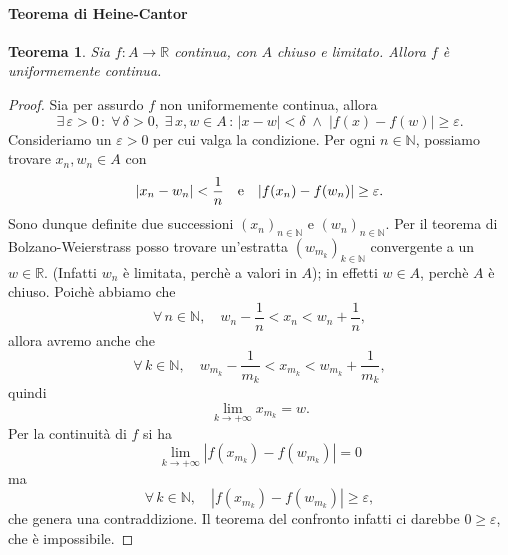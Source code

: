 \documentclass{article}
\theoremstyle{plain}
\newtheorem{thm}{Teorema}[section]
\theoremstyle{definition}
\theoremstyle{remark}
\begin{document}
\vspace{10pt}

\paragraph{Teorema di Heine-Cantor}
\begin{bxthm}
\begin{thm}
    Sia $f:A\to\mathbb{R}$ continua, con $A$ chiuso e limitato.
    Allora $f$ è uniformemente continua.
\end{thm}
\end{bxthm}
\begin{proof}
    Sia per assurdo $f$ non uniformemente continua, allora
    \[\exists\,\varepsilon>0\,:\;\forall\,\delta>0,\;\exists\, x,w\in A \,:\, |x-w|<\delta \;\land\; |f(x)-f(w)|\geq\varepsilon.\]
    Consideriamo un $\varepsilon>0$ per cui valga la condizione. 
    Per ogni $n\in\mathbb{N}$, possiamo trovare $x_n, w_n \in A$ con \[|x_n-w_n|<\frac{1}{n}\quad\textup{e}\quad|f(x_n)-f(w_n)|\geq\varepsilon.\]
    Sono dunque definite due successioni $(x_n)_{n\in\mathbb{N}}$ e $(w_n)_{n\in\mathbb{N}}$.
    Per il teorema di Bolzano-Weierstrass posso trovare un'estratta $(w_{m_k})_{k\in\mathbb{N}}$ convergente a un $w\in\mathbb{R}$.
    (Infatti $w_n$ è limitata, perchè a valori in $A$); in effetti $w\in A$, perchè $A$ è chiuso.
    Poichè abbiamo che
    \[\forall\,n\in\mathbb{N},\quad w_n-\dfrac{1}{n} < x_n < w_n + \dfrac{1}{n},\] 
    allora avremo anche che 
    \[\forall\,k\in\mathbb{N},\quad w_{m_k}-\dfrac{1}{m_k}<x_{m_k}<w_{m_k}+\dfrac{1}{m_k},\]
    quindi \[\lim_{k\to+\infty}x_{m_k}=w.\]
    Per la continuità di $f$ si ha 
    \[\lim_{k\to+\infty}|f(x_{m_k})-f(w_{m_k})|=0\] 
    ma \[\forall\,k\in\mathbb{N},\quad|f(x_{m_k})-f(w_{m_k})|\geq\varepsilon,\] che genera una contraddizione. 
    Il teorema del confronto infatti ci darebbe $0\geq\varepsilon$, che è impossibile.
\end{proof}

\vspace{10pt}
\end{document}
